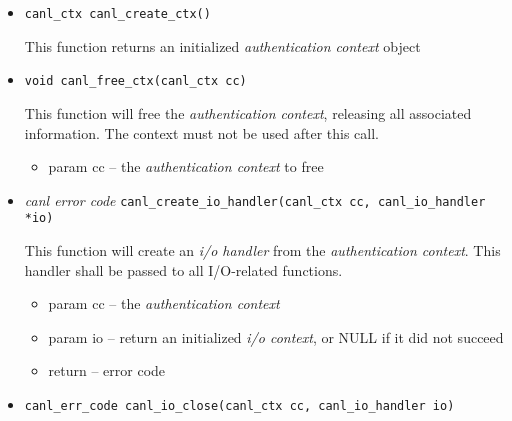 \begin{itemize}
  \item \verb'canl_ctx canl_create_ctx()'

  This function
  returns an initialized \textit{authentication context} object
  \item \verb'void canl_free_ctx(canl_ctx cc)'

  This function will free the \textit{authentication context}, releasing 
  all associated information.  The context must not be used after this call.
  \begin{itemize}
    \item param cc -- the \textit{authentication context} to free
  \end{itemize}
  \item \textit{canl error code}
  \verb'canl_create_io_handler(canl_ctx cc, canl_io_handler *io)'

  This function will create an \textit{i/o handler} from the 
\textit{authentication context}. This handler shall be passed to
all I/O-related functions.
  \begin{itemize}
    \item param cc -- the \textit{authentication context}
    \item param io --  return an initialized \textit{i/o context}, 
or NULL if it did not succeed
    \item return -- \CANL error code
  \end{itemize}

  \item \verb'canl_err_code canl_io_close(canl_ctx cc, canl_io_handler io)'


\end{itemize}
